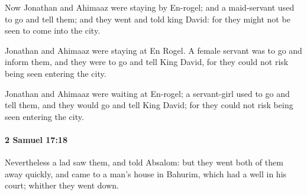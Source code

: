 			\begin{versebox}
					\item[BHS] 
					\item[ASV] Now Jonathan and Ahimaaz were staying by En-rogel; and a maid-servant used to go and tell them; and they went and told king David: for they might not be seen to come into the city.
					\item[NIV] Jonathan and Ahimaaz were staying at En Rogel. A female servant was to go and inform them, and they were to go and tell King David, for they could not risk being seen entering the city.
					\item[NRSV] Jonathan and Ahimaaz were waiting at En-rogel; a servant-girl used to go and tell them, and they would go and tell King David; for they could not risk being seen entering the city.
			\end{versebox}

		\paragraph{2 Samuel 17:18} %
			\label{2SAMUEL-17-18}

			Nevertheless a lad saw them, and told Absalom: but they went both of them away quickly, and came to a man’s house in Bahurim, which had a well in his court; whither they went down.


